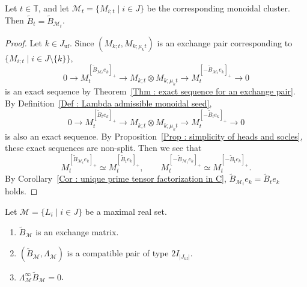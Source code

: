 \begin{Prop}
\label{Prop : exchange matrices of monoidal clusters}
Let $t \in \mathbb T$, and let
$\mathcal M_t = \{M_{i;t} \mid i \in J\}$ be the corresponding
monoidal cluster.
Then $\widetilde B_t = \widetilde B_{\mathcal M_t}$.
\end{Prop}

\begin{proof}
Let $k \in J_{\mathrm{uf}}$.
Since $(M_{k;t}, M_{k;\mu_k t})$ is an exchange pair corresponding to
$\{M_{i;t} \mid i \in J \setminus \{k\}\}$,
\[
0 \longrightarrow
M_t^{[\widetilde B_{\mathcal M_t}e_k]_+}
\longrightarrow M_{k;t} \otimes M_{k;\mu_k t}
\longrightarrow M_t^{[-\widetilde B_{\mathcal M_t}e_k]_+}
\longrightarrow 0
\]
is an exact sequence by
Theorem~\ref{Thm : exact sequence for an exchange pair}.
By Definition~\ref{Def : Lambda admissible monoidal seed},
\[
0 \longrightarrow M_t^{[\widetilde B_t e_k]_+}
\longrightarrow M_{k;t} \otimes M_{k;\mu_k t}
\longrightarrow M_t^{[-\widetilde B_t e_k]_+}
\longrightarrow 0
\]
is also an exact sequence.
By Proposition~\ref{Prop : simplicity of heads and socles},
these exact sequences are non-split.
Then we see that
\[
M_t^{[\widetilde B_{\mathcal M_t}e_k]_+}
\simeq M_t^{[\widetilde B_t e_k]_+},
\qquad
M_t^{[-\widetilde B_{\mathcal M_t}e_k]_+}
\simeq M_t^{[-\widetilde B_t e_k]_+}.
\]
By Corollary~\ref{Cor : unique prime tensor factorization in C},
$\widetilde B_{\mathcal M_t}e_k = \widetilde B_t e_k$ holds.
\end{proof}

\begin{Prop}
\label{Prop : compatibility for maximal real sets}
Let $\mathcal M = \{L_i \mid i \in J\}$ be a maximal real set.
\begin{enumerate}
    \item[(i)] $\widetilde B_{\mathcal M}$ is an exchange matrix.
    \item[(ii)] $(\widetilde B_{\mathcal M}, \Lambda_{\mathcal M})$
    is a compatible pair of type $2I_{|J_{\mathrm{uf}}|}$.
    \item[(iii)]
    $\Lambda^{\infty}_{\mathcal M}\widetilde B_{\mathcal M} = 0$.
\end{enumerate}
\end{Prop}

